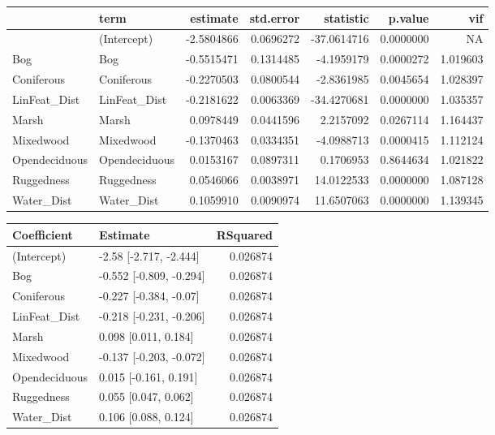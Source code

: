 \documentclass[]{article}
\begin{document}
\begin{tabular}{llrrrrr}
\toprule
  & term & estimate & std.error & statistic & p.value & vif\\
\midrule
 & (Intercept) & -2.5804866 & 0.0696272 & -37.0614716 & 0.0000000 & NA\\
Bog & Bog & -0.5515471 & 0.1314485 & -4.1959179 & 0.0000272 & 1.019603\\
Coniferous & Coniferous & -0.2270503 & 0.0800544 & -2.8361985 & 0.0045654 & 1.028397\\
LinFeat\_Dist & LinFeat\_Dist & -0.2181622 & 0.0063369 & -34.4270681 & 0.0000000 & 1.035357\\
Marsh & Marsh & 0.0978449 & 0.0441596 & 2.2157092 & 0.0267114 & 1.164437\\
Mixedwood & Mixedwood & -0.1370463 & 0.0334351 & -4.0988713 & 0.0000415 & 1.112124\\
Opendeciduous & Opendeciduous & 0.0153167 & 0.0897311 & 0.1706953 & 0.8644634 & 1.021822\\
Ruggedness & Ruggedness & 0.0546066 & 0.0038971 & 14.0122533 & 0.0000000 & 1.087128\\
Water\_Dist & Water\_Dist & 0.1059910 & 0.0090974 & 11.6507063 & 0.0000000 & 1.139345\\
\bottomrule
\end{tabular}

\begin{tabular}{llr}
\toprule
Coefficient & Estimate & RSquared\\
\midrule
(Intercept) & -2.58 [-2.717, -2.444] & 0.026874\\
Bog & -0.552 [-0.809, -0.294] & 0.026874\\
Coniferous & -0.227 [-0.384, -0.07] & 0.026874\\
LinFeat\_Dist & -0.218 [-0.231, -0.206] & 0.026874\\
Marsh & 0.098 [0.011, 0.184] & 0.026874\\
Mixedwood & -0.137 [-0.203, -0.072] & 0.026874\\
Opendeciduous & 0.015 [-0.161, 0.191] & 0.026874\\
Ruggedness & 0.055 [0.047, 0.062] & 0.026874\\
Water\_Dist & 0.106 [0.088, 0.124] & 0.026874\\
\bottomrule
\end{tabular}
\end{document}
